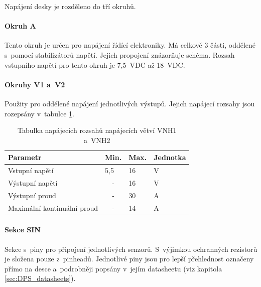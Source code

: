 Napájení desky je rozděleno do tří okruhů. 

\paragraph{Okruh A}
\label{par:PowerCircuitA}
Tento okruh je určen pro napájení řídící elektroniky.
Má celkově 3 části, oddělené s~pomocí stabilizátorů napětí.
Jejich propojení znázorňuje schéma.
Rozsah vstupního napětí pro tento okruh je 7,5~VDC až 18~VDC.

\paragraph{Okruhy V1 a~V2}
Použity pro oddělené napájení jednotlivých výstupů. 
Jejich napájecí rozsahy jsou rozepsány v~tabulce \ref{fig:powerSourceCharsVNH}.

\begin{table}[h]
    \centering
    \begin{tabular}{llll}
        \hline
        \multicolumn{1}{|l|}{\textbf{Parametr}}           & \multicolumn{1}{l|}{\textbf{Min.}} & \multicolumn{1}{l|}{\textbf{Max.}} & \multicolumn{1}{l|}{\textbf{Jednotka}} \\ \hline
        \multicolumn{1}{|l|}{Vstupní napětí}              & \multicolumn{1}{l|}{5,5}           & \multicolumn{1}{l|}{16}            & \multicolumn{1}{l|}{V}                 \\ \hline
        \multicolumn{1}{|l|}{Výstupní napětí}             & \multicolumn{1}{c|}{-}             & \multicolumn{1}{l|}{16}            & \multicolumn{1}{l|}{V}                 \\ \hline
        \multicolumn{1}{|l|}{Výstupní proud}              & \multicolumn{1}{c|}{-}             & \multicolumn{1}{l|}{30}            & \multicolumn{1}{l|}{A}                 \\ \hline
        \multicolumn{1}{|l|}{Maximální kontinuální proud} & \multicolumn{1}{c|}{-}             & \multicolumn{1}{l|}{14}            & \multicolumn{1}{l|}{A}                 \\ \hline
    \end{tabular}
    \caption{Tabulka napájecích rozsahů napájecích větví VNH1 a~VNH2}
    \label{fig:powerSourceCharsVNH}
\end{table}

\paragraph{Sekce SIN}
Sekce s~piny pro připojení jednotlivých senzorů. 
S~výjimkou ochranných rezistorů je složena pouze z~pinheadů.
Jednotlivé piny jsou pro lepší přehlednost označeny přímo na desce a~podrobněji popsány v~jejím datasheetu (viz kapitola \ref{sec:DPS_datasheets}). 

